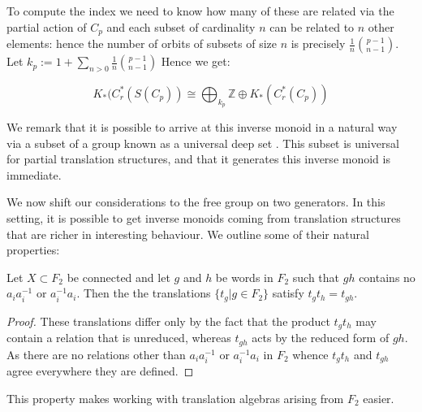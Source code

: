 \begin{example}
To compute the index we need to know how many of these are related via the partial action of $C_{p}$ and each subset of cardinality $n$ can be related to $n$ other elements: hence the number of orbits of subsets of size $n$ is precisely $\frac{1}{n} {p-1 \choose n-1}$. Let $k_{p}:= 1+ \sum_{n>0}\frac{1}{n} {p-1 \choose n-1}$ Hence we get:

\begin{equation*}
K_{*}(C^{*}_{r}(S(C_{p})) \cong \bigoplus_{k_{p}}\mathbb{Z} \oplus K_{*}(C^{*}_{r}(C_{p}))
\end{equation*}

We remark that it is possible to arrive at this inverse monoid in a natural way via a subset of a group known as a universal deep set \cite{BNW-KTA}. This subset is universal for partial translation structures, and that it generates this inverse monoid is immediate.

\end{example}

We now shift our considerations to the free group on two generators. In this setting, it is possible to get inverse monoids coming from translation structures that are richer in interesting behaviour. We outline some of their natural properties:

\begin{claim}
Let $X \subset F_{2}$ be connected and let $g$ and $h$ be words in $F_{2}$ such that $gh$ contains no $a_{i}a_{i}^{-1}$ or $a_{i}^{-1}a_{i}$. Then the the translations $\lbrace t_{g} | g \in F_{2} \rbrace$ satisfy $t_{g}t_{h}=t_{gh}$. 
\end{claim}
\begin{proof}
These translations differ only by the fact that the product $t_{g}t_{h}$ may contain a relation that is unreduced, whereas $t_{gh}$ acts by the reduced form of $gh$. As there are no relations other than $a_{i}a_{i}^{-1}$ or $a_{i}^{-1}a_{i}$ in $F_{2}$ whence $t_{g}t_{h}$ and $t_{gh}$ agree everywhere they are defined.
\end{proof}

This property makes working with translation algebras arising from $F_{2}$ easier.


